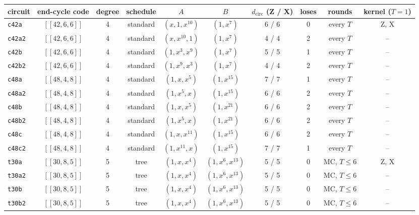 \begin{tabular}{@{}lccccccccc@{}}
\toprule
circuit & end-cycle code & degree & schedule & $A$ & $B$ & $d_{\mathrm{circ}}$ (Z / X) & loses & rounds & kernel ($T=1$) \\
\midrule
\texttt{c42a} & $[[42,6,6]]$ & 4 & standard & $(x, 1, x^{10})$ & $(1, x^{7})$ & 6 / 6 & 0 & every $T$ & Z, X \\
\texttt{c42a2} & $[[42,6,6]]$ & 4 & standard & $(x, x^{10}, 1)$ & $(1, x^{7})$ & 4 / 4 & 2 & every $T$ & -- \\
\texttt{c42b} & $[[42,6,6]]$ & 4 & standard & $(1, x^{3}, x^{9})$ & $(1, x^{7})$ & 5 / 5 & 1 & every $T$ & -- \\
\texttt{c42b2} & $[[42,6,6]]$ & 4 & standard & $(1, x^{9}, x^{3})$ & $(1, x^{7})$ & 4 / 4 & 2 & every $T$ & -- \\
\texttt{c48a} & $[[48,4,8]]$ & 4 & standard & $(1, x, x^{5})$ & $(1, x^{15})$ & 7 / 7 & 1 & every $T$ & -- \\
\texttt{c48a2} & $[[48,4,8]]$ & 4 & standard & $(1, x^{5}, x)$ & $(1, x^{15})$ & 6 / 6 & 2 & every $T$ & -- \\
\texttt{c48b} & $[[48,4,8]]$ & 4 & standard & $(1, x, x^{5})$ & $(1, x^{21})$ & 6 / 6 & 2 & every $T$ & -- \\
\texttt{c48b2} & $[[48,4,8]]$ & 4 & standard & $(1, x^{5}, x)$ & $(1, x^{21})$ & 6 / 6 & 2 & every $T$ & -- \\
\texttt{c48c} & $[[48,4,8]]$ & 4 & standard & $(1, x, x^{11})$ & $(1, x^{15})$ & 6 / 6 & 2 & every $T$ & -- \\
\texttt{c48c2} & $[[48,4,8]]$ & 4 & standard & $(1, x^{11}, x)$ & $(1, x^{15})$ & 7 / 7 & 1 & every $T$ & -- \\
\texttt{t30a} & $[[30,8,5]]$ & 5 & tree & $(1, x, x^{4})$ & $(1, x^{6}, x^{13})$ & 5 / 5 & 0 & MC, $T\le 6$ & Z, X \\
\texttt{t30a2} & $[[30,8,5]]$ & 5 & tree & $(1, x, x^{4})$ & $(1, x^{6}, x^{13})$ & 5 / 5 & 0 & MC, $T\le 6$ & -- \\
\texttt{t30b} & $[[30,8,5]]$ & 5 & tree & $(1, x, x^{4})$ & $(1, x^{6}, x^{13})$ & 5 / 5 & 0 & MC, $T\le 6$ & -- \\
\texttt{t30b2} & $[[30,8,5]]$ & 5 & tree & $(1, x, x^{4})$ & $(1, x^{6}, x^{13})$ & 5 / 5 & 0 & MC, $T\le 6$ & -- \\
\bottomrule
\end{tabular}
